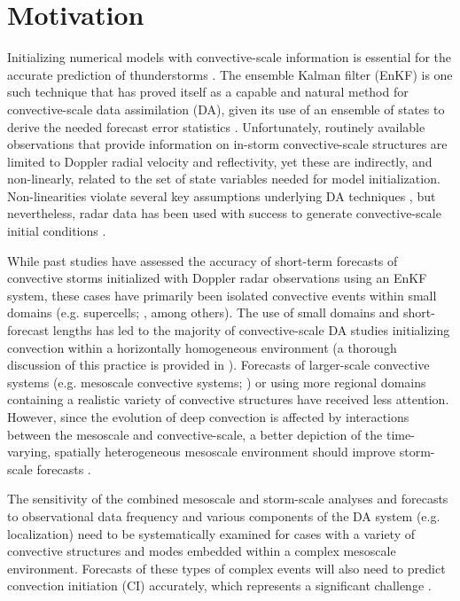 \chapter{Motivation}
Initializing numerical models with convective-scale information is essential for the accurate prediction of thunderstorms \citep{lilly90}. The ensemble Kalman filter (EnKF) is one such technique that has proved itself as a capable and natural method for convective-scale data assimilation (DA), given its use of an ensemble of states to derive the needed forecast error statistics \citep{evensen94,snyderzhang03}. Unfortunately, routinely available observations that provide information on in-storm convective-scale structures are limited to Doppler radial velocity and reflectivity, yet these are indirectly, and non-linearly, related to the set of state variables needed for model initialization. Non-linearities violate several key assumptions underlying DA techniques \citep{kalnaybook}, but nevertheless, radar data has  been used with success to generate convective-scale initial conditions \citep{sun05}.

While past studies have assessed the accuracy of short-term forecasts of convective storms initialized with Doppler radar observations using an EnKF system, these cases have primarily been isolated convective events within small domains (e.g. supercells; \citealt{dowellwicker09,dowelletal11,dawsonetal12}, among others). The use of small domains and short-forecast lengths has led to the majority of convective-scale DA studies initializing convection within a horizontally homogeneous environment (a thorough discussion of this practice is provided in \citealt{dawsonetal12}). Forecasts of larger-scale convective systems (e.g. mesoscale convective systems; \citealt{wheatleystensrud10,snooketal12}) or using more regional domains containing a realistic variety of convective structures have received less attention. However, since the evolution of deep convection is affected by interactions between the mesoscale and convective-scale, a better depiction of the time-varying, spatially heterogeneous mesoscale environment should improve storm-scale forecasts \citep{stensrudgao10,stensrudetal13}. 

The sensitivity of the combined mesoscale and storm-scale analyses and forecasts to observational data frequency and various components of the DA system (e.g. localization) need to be systematically examined for cases with a variety of convective structures and modes embedded within a complex mesoscale environment. Forecasts of these types of complex events will also need to predict convection initiation (CI) accurately, which represents a significant challenge \citep{kainetal13}.

